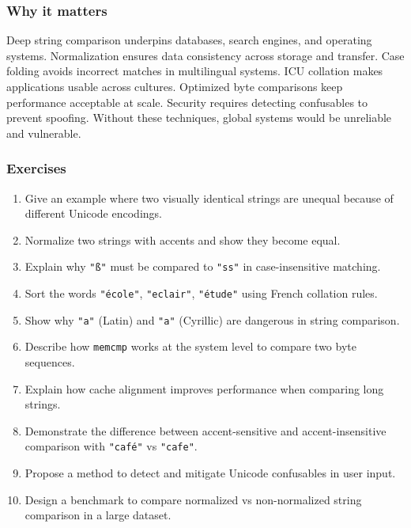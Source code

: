 \documentclass[
  letterpaper,
  DIV=11,
  numbers=noendperiod]{scrreprt}
\providecommand{\tightlist}{%
  \setlength{\itemsep}{0pt}\setlength{\parskip}{0pt}}
\begin{document}
\subsubsection{Why it matters}\label{why-it-matters-38}

Deep string comparison underpins databases, search engines, and
operating systems. Normalization ensures data consistency across storage
and transfer. Case folding avoids incorrect matches in multilingual
systems. ICU collation makes applications usable across cultures.
Optimized byte comparisons keep performance acceptable at scale.
Security requires detecting confusables to prevent spoofing. Without
these techniques, global systems would be unreliable and vulnerable.

\subsubsection{Exercises}\label{exercises-37}

\begin{enumerate}
\def\labelenumi{\arabic{enumi}.}
\tightlist
\item
  Give an example where two visually identical strings are unequal
  because of different Unicode encodings.
\item
  Normalize two strings with accents and show they become equal.
\item
  Explain why \texttt{"ß"} must be compared to \texttt{"ss"} in
  case-insensitive matching.
\item
  Sort the words \texttt{"école"}, \texttt{"eclair"}, \texttt{"étude"}
  using French collation rules.
\item
  Show why \texttt{"a"} (Latin) and \texttt{"а"} (Cyrillic) are
  dangerous in string comparison.
\item
  Describe how \texttt{memcmp} works at the system level to compare two
  byte sequences.
\item
  Explain how cache alignment improves performance when comparing long
  strings.
\item
  Demonstrate the difference between accent-sensitive and
  accent-insensitive comparison with \texttt{"café"} vs \texttt{"cafe"}.
\item
  Propose a method to detect and mitigate Unicode confusables in user
  input.
\item
  Design a benchmark to compare normalized vs non-normalized string
  comparison in a large dataset.
\end{enumerate}
\end{document}
